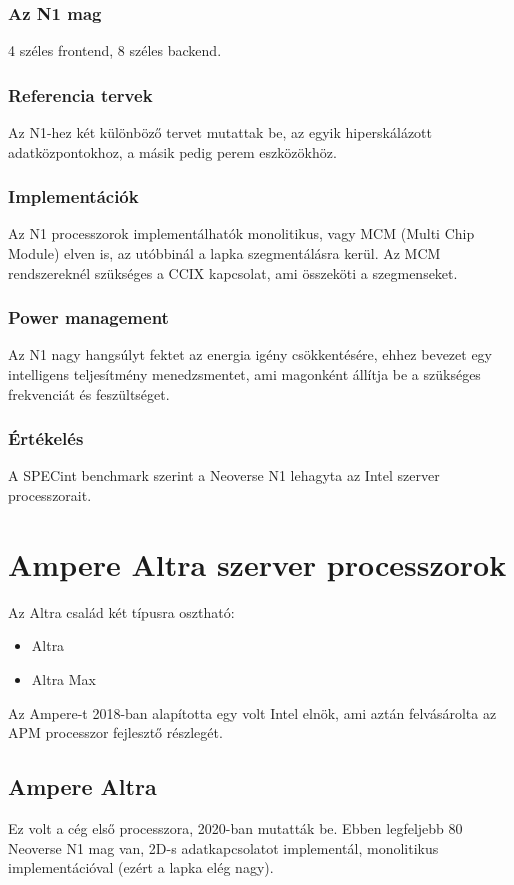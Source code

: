 \subsubsection{Az N1 mag}
4 széles frontend, 8 széles backend.

\subsubsection{Referencia tervek}
Az N1-hez két különböző tervet mutattak be, az egyik hiperskálázott adatközpontokhoz, a másik pedig perem eszközökhöz.

\subsubsection{Implementációk}
Az N1 processzorok implementálhatók monolitikus, vagy MCM (Multi Chip Module) elven is, az utóbbinál a lapka szegmentálásra kerül.
Az MCM rendszereknél szükséges a CCIX kapcsolat, ami összeköti a szegmenseket.

\subsubsection{Power management}
Az N1 nagy hangsúlyt fektet az energia igény csökkentésére, ehhez bevezet egy intelligens teljesítmény menedzsmentet, ami magonként állítja be a szükséges frekvenciát és feszültséget.

\subsubsection{Értékelés}
A SPECint benchmark szerint a Neoverse N1 lehagyta az Intel szerver processzorait.

\section{Ampere Altra szerver processzorok}
Az Altra család két típusra osztható:
\begin{itemize}
    \item Altra
    \item Altra Max
\end{itemize}
Az Ampere-t 2018-ban alapította egy volt Intel elnök, ami aztán felvásárolta az APM processzor fejlesztő részlegét.

\subsection{Ampere Altra}
Ez volt a cég első processzora, 2020-ban mutatták be.
Ebben legfeljebb 80 Neoverse N1 mag van, 2D-s adatkapcsolatot implementál, monolitikus implementációval (ezért a lapka elég nagy).

